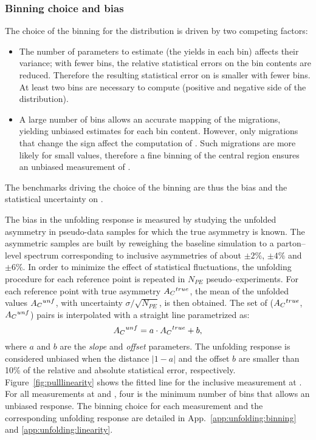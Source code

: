 \subsubsection{Binning choice and bias}
\label{sec:binandbias}

The choice of the binning for the \dy{} distribution is driven by two
competing factors:
\begin{itemize}
\item The number of parameters to estimate (the yields in each \dy{}
  bin) affects their variance; with fewer bins, the relative statistical
  errors on the bin contents are reduced. Therefore the resulting
  statistical error on \ac{} is smaller with fewer bins. At least two
  bins are necessary to compute \ac{} (positive and negative side of
  the \dy{} distribution).
\item A large number of bins allows an accurate mapping of the
  migrations, yielding unbiased estimates for each bin
  content. However, only migrations that change the \dy{} sign affect
  the computation of \ac{}. Such migrations are more likely for small
  \dy{} values, therefore a fine binning of the central \dy{} region
  ensures an unbiased measurement of \ac{}. 
\end{itemize}
The benchmarks driving the choice of the binning are thus the bias and
the statistical uncertainty on \ac{}.

The bias in the unfolding response is measured by studying the
unfolded asymmetry in pseudo-data samples for which the true
asymmetry is known. The asymmetric samples are built by reweighing the
baseline \ttbar{} simulation to a parton--level \dy{} spectrum
corresponding to inclusive asymmetries of about $\pm2\%$, $\pm4\%$ and
$\pm6\%$.
In order to minimize the effect of statistical fluctuations, the
unfolding procedure for each reference point is repeated in $N_{PE}$
pseudo--experiments. For each reference point with true asymmetry
$A_C{}^{true}$, the mean of the unfolded values $A_C{}^{unf}$, with
uncertainty $\sigma/\sqrt{N_{PE}}$, is then obtained. The set of
($A_C{}^{true}$,$A_C{}^{unf}$) pairs is interpolated with a straight
line parametrized as:
\begin{equation}
A_C{}^{unf}=a\cdot{}A_C{}^{true}+b,
\end{equation}
where $a$ and $b$ are the {\it slope} and {\it offset} parameters.
The unfolding response is considered unbiased when the distance
$|1-a|$ and the offset $b$ are smaller than 10\% of the relative and
absolute statistical error, respectively.
Figure~\ref{fig:pulllinearity} shows the fitted line for
the inclusive \ac{} measurement at \eighttev{}.
For all measurements at \seventev{} and \eighttev{}, four is the
minimum number of \dy{} bins that allows an unbiased
response. The binning choice for each measurement and the
corresponding unfolding response are detailed in
App.~\ref{app:unfolding:binning} and \ref{app:unfolding:linearity}.

